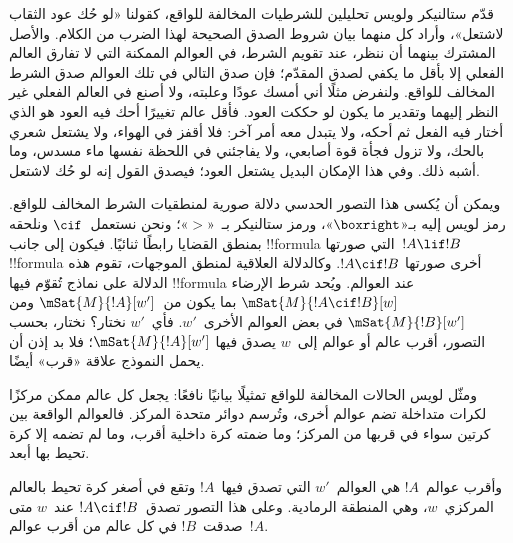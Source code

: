 \documentclass[../../../include/open-logic-section]{subfiles}
\begin{document}


قدّم ستالنيكر ولويس تحليلين للشرطيات المخالفة للواقع، كقولنا «لو حُك
عود الثقاب لاشتعل»، وأراد كل منهما بيان شروط الصدق الصحيحة لهذا الضرب
من الكلام. والأصل المشترك بينهما أن ننظر، عند تقويم الشرط، في العوالم
الممكنة التي لا تفارق العالم الفعلي إلا بأقل ما يكفي لصدق المقدّم؛ فإن
صدق التالي في تلك العوالم صدق الشرط المخالف للواقع. ولنفرض مثلًا أني
أمسك عودًا وعلبته، ولا أصنع في العالم الفعلي غير النظر إليهما وتقدير ما
يكون لو حككت العود. فأقل عالم تغييرًا أحك فيه العود هو الذي أختار فيه
الفعل ثم أحكه، ولا يتبدل معه أمر آخر: فلا أقفز في الهواء، ولا يشتعل
شعري بالحك، ولا تزول فجأة قوة أصابعي، ولا يفاجئني في اللحظة نفسها ماء
مسدس، وما أشبه ذلك. وفي هذا الإمكان البديل يشتعل العود؛ فيصدق القول إنه
لو حُك لاشتعل.

ويمكن أن يُكسى هذا التصور الحدسي دلالة صورية لمنطقيات الشرط المخالف
للواقع. رمز لويس إليه بـ«$\boxright$»، ورمز ستالنيكر بـ~«$>$»؛ ونحن
نستعمل~$\cif$ ونلحقه بمنطق القضايا رابطًا ثنائيًا. فيكون إلى جانب
!!{formula} التي صورتها~$!A \lif !B$ !!{formula} أخرى صورتها
$!A \cif !B$. وكالدلالة العلاقية لمنطق الموجهات، تقوم هذه الدلالة على
نماذج تُقوّم فيها !!{formula} عند العوالم. ويُحد شرط الإرضاء
$\mSat{M}{!A \cif !B}[w]$ بما يكون من~$\mSat{M}{!A}[w']$ ومن
$\mSat{M}{!B}[w']$ في بعض العوالم الأخرى~$w'$. فأي~$w'$ نختار؟ نختار،
بحسب التصور، أقرب عالم أو عوالم إلى~$w$ يصدق فيها
$\mSat{M}{!A}[w']$؛ فلا بد إذن أن يحمل النموذج علاقة «قرب» أيضًا.

ومثّل لويس الحالات المخالفة للواقع تمثيلًا بيانيًا نافعًا: يجعل كل عالم
ممكن مركزًا لكرات متداخلة تضم عوالم أخرى، وتُرسم دوائر متحدة المركز.
فالعوالم الواقعة بين كرتين سواء في قربها من المركز؛ وما ضمته كرة داخلية
أقرب، وما لم تضمه إلا كرة تحيط بها أبعد.
\begin{center}
\end{center}
وأقرب عوالم~$!A$ هي العوالم~$w'$ التي تصدق فيها~$!A$ وتقع في أصغر
كرة تحيط بالعالم المركزي~$w$، وهي المنطقة الرمادية. وعلى هذا التصور
تصدق~$!A \cif !B$ عند~$w$ متى صدقت~$!B$ في كل عالم من أقرب
عوالم~$!A$.
\end{document}
